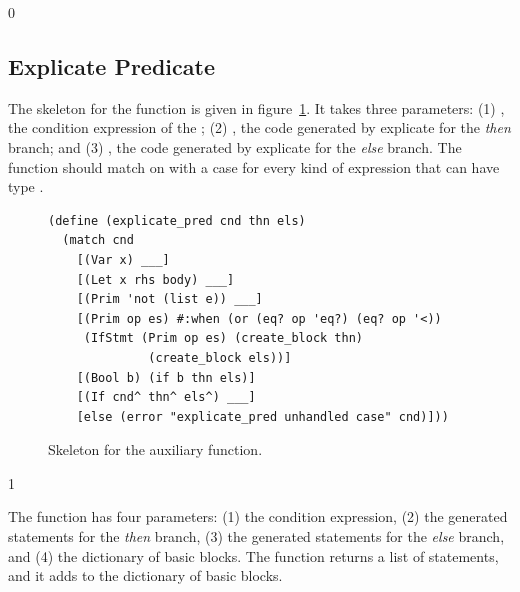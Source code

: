 \documentclass[7x10]{TimesAPriori_MIT}%
\def\racketEd{0}
\def\pythonEd{1}
\providecommand{\BookEdition}{1}
\let\edition\BookEdition
\newcommand{\pythonColor}[0]{}
\numberwithin{theorem}{chapter}
\numberwithin{definition}{chapter}
\numberwithin{equation}{chapter}
\begin{document}
{\if\edition\racketEd
  
\subsection{Explicate Predicate}

The skeleton for the  function is given in
figure~\ref{fig:explicate-pred}.  It takes three parameters: (1)
, the condition expression of the ; (2) ,
the code generated by explicate for the \emph{then} branch; and (3)
, the code generated by explicate for the \emph{else}
branch.  The  function should match on
 with a case for every kind of expression that can have type
\BOOLTY{}.

\begin{figure}[tbp]
  \begin{tcolorbox}[colback=white]
    \begin{lstlisting}
(define (explicate_pred cnd thn els)
  (match cnd
    [(Var x) ___]
    [(Let x rhs body) ___]
    [(Prim 'not (list e)) ___]
    [(Prim op es) #:when (or (eq? op 'eq?) (eq? op '<))
     (IfStmt (Prim op es) (create_block thn)
              (create_block els))]
    [(Bool b) (if b thn els)]
    [(If cnd^ thn^ els^) ___]
    [else (error "explicate_pred unhandled case" cnd)]))
\end{lstlisting}
  \end{tcolorbox}

  \caption{Skeleton for the  auxiliary function.}
\label{fig:explicate-pred}
\end{figure}

\fi}
%
{\if\edition\pythonEd\pythonColor

The  function has four parameters: (1) the
condition expression, (2) the generated statements for the \emph{then}
branch, (3) the generated statements for the \emph{else} branch, and
(4) the dictionary of basic blocks. The 
function returns a list of statements, and it adds to the dictionary
of basic blocks.

\fi}
\end{document}
